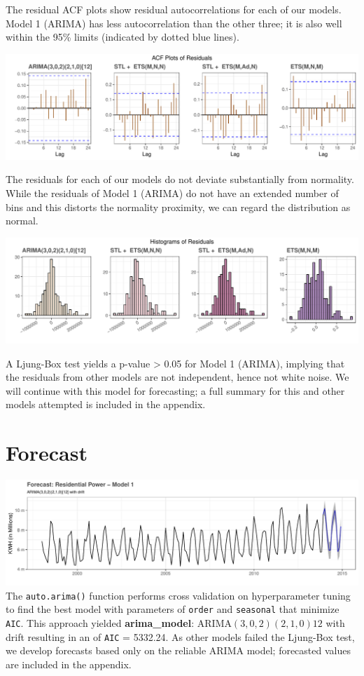 \documentclass[openany]{book}
\begin{document}
The residual ACF plots show residual autocorrelations for each of our
models. Model 1 (ARIMA) has less autocorrelation than the other three;
it is also well within the 95\% limits (indicated by dotted blue lines).

\includegraphics{Group2_Project1_Fall2019_files/figure-latex/unnamed-chunk-10-1.pdf}

The residuals for each of our models do not deviate substantially from
normality. While the residuals of Model 1 (ARIMA) do not have an
extended number of bins and this distorts the normality proximity, we
can regard the distribution as normal.

\includegraphics{Group2_Project1_Fall2019_files/figure-latex/unnamed-chunk-11-1.pdf}

A Ljung-Box test yields a p-value \textgreater{} 0.05 for Model 1
(ARIMA), implying that the residuals from other models are not
independent, hence not white noise. We will continue with this model for
forecasting; a full summary for this and other models attempted is
included in the appendix.

\hypertarget{forecast-1}{%
\section{Forecast}\label{forecast-1}}

\includegraphics{Group2_Project1_Fall2019_files/figure-latex/unnamed-chunk-12-1.pdf}
The \texttt{auto.arima()} function performs cross validation on
hyperparameter tuning to find the best model with parameters of
\texttt{order} and \texttt{seasonal} that minimize \texttt{AIC}. This
approach yielded \textbf{arima\_model}: ARIMA\((3,0,2)(2,1,0)12\) with
drift resulting in an of \texttt{AIC} = 5332.24. As other models failed
the Ljung-Box test, we develop forecasts based only on the reliable
ARIMA model; forecasted values are included in the appendix.
\end{document}
